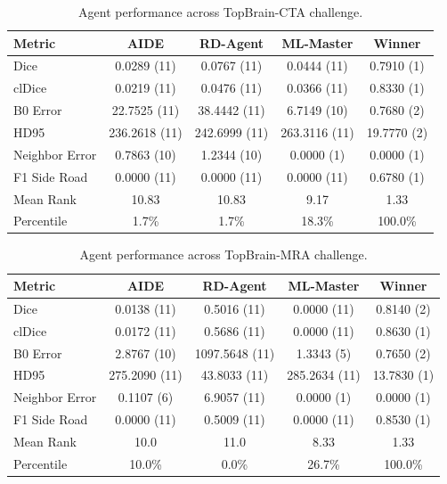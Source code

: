 \begin{table}[htbp]
\centering
\small
\caption{Agent performance across TopBrain-CTA challenge.}
\vspace{3pt} \label{tab:topbrain-track1}
\begin{tabular}{lcccc}
\toprule
\textbf{Metric} & \textbf{AIDE} & \textbf{RD-Agent} & \textbf{ML-Master} & \textbf{Winner} \\
\midrule
Dice & 0.0289 (11) & 0.0767 (11) & 0.0444 (11) & 0.7910 (1) \\
clDice & 0.0219 (11) & 0.0476 (11) & 0.0366 (11) & 0.8330 (1) \\
B0 Error & 22.7525 (11) & 38.4442 (11) & 6.7149 (10) & 0.7680 (2) \\
HD95 & 236.2618 (11) & 242.6999 (11) & 263.3116 (11) & 19.7770 (2) \\
Neighbor Error & 0.7863 (10) & 1.2344 (10) & 0.0000 (1) & 0.0000 (1) \\
F1 Side Road & 0.0000 (11) & 0.0000 (11) & 0.0000 (11) & 0.6780 (1) \\
\midrule
Mean Rank & 10.83 & 10.83 & 9.17 & 1.33 \\
Percentile & 1.7\% & 1.7\% & 18.3\% & 100.0\% \\
\bottomrule
\end{tabular}
\end{table}

\begin{table}[htbp]
\centering
\small
\caption{Agent performance across TopBrain-MRA challenge.}
\vspace{3pt} \label{tab:topbrain-track2}
\begin{tabular}{lcccc}
\toprule
\textbf{Metric} & \textbf{AIDE} & \textbf{RD-Agent} & \textbf{ML-Master} & \textbf{Winner} \\
\midrule
Dice & 0.0138 (11) & 0.5016 (11) & 0.0000 (11) & 0.8140 (2) \\
clDice & 0.0172 (11) & 0.5686 (11) & 0.0000 (11) & 0.8630 (1) \\
B0 Error & 2.8767 (10) & 1097.5648 (11) & 1.3343 (5) & 0.7650 (2) \\
HD95 & 275.2090 (11) & 43.8033 (11) & 285.2634 (11) & 13.7830 (1) \\
Neighbor Error & 0.1107 (6) & 6.9057 (11) & 0.0000 (1) & 0.0000 (1) \\
F1 Side Road & 0.0000 (11) & 0.5009 (11) & 0.0000 (11) & 0.8530 (1) \\
\midrule
Mean Rank & 10.0 & 11.0 & 8.33 & 1.33 \\
Percentile & 10.0\% & 0.0\% & 26.7\% & 100.0\% \\
\bottomrule
\end{tabular}
\end{table}

